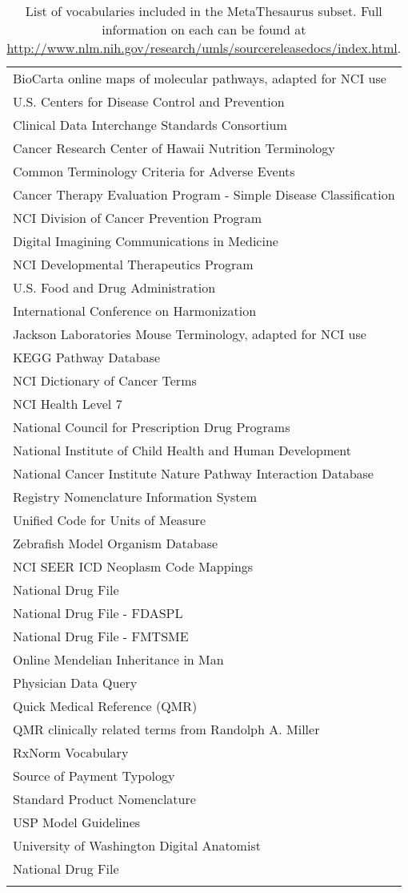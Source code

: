 \documentclass[Report.tex]{subfiles}
\begin{document}
\begin{longtable}{| p{} |}
BioCarta online maps of molecular pathways, adapted for NCI use\\
U.S. Centers for Disease Control and Prevention\\
Clinical Data Interchange Standards Consortium\\
Cancer Research Center of Hawaii Nutrition Terminology\\
Common Terminology Criteria for Adverse Events\\
Cancer Therapy Evaluation Program - Simple Disease Classification\\
NCI Division of Cancer Prevention Program\\
Digital Imagining Communications in Medicine\\
NCI Developmental Therapeutics Program\\
U.S. Food and Drug Administration\\
International Conference on Harmonization\\
Jackson Laboratories Mouse Terminology, adapted for NCI use\\
KEGG Pathway Database\\
NCI Dictionary of Cancer Terms\\
NCI Health Level 7\\
National Council for Prescription Drug Programs\\
National Institute of Child Health and Human Development\\
National Cancer Institute Nature Pathway Interaction Database\\
Registry Nomenclature Information System\\
Unified Code for Units of Measure\\
Zebrafish Model Organism Database\\
NCI SEER ICD Neoplasm Code Mappings\\
National Drug File\\
National Drug File - FDASPL\\
National Drug File - FMTSME\\
Online Mendelian Inheritance in Man\\
Physician Data Query\\
Quick Medical Reference (QMR)\\
QMR clinically related terms from Randolph A. Miller\\
RxNorm Vocabulary\\
Source of Payment Typology\\
Standard Product Nomenclature\\
USP Model Guidelines\\
University of Washington Digital Anatomist\\
National Drug File\\ \hline
\caption{List of vocabularies included in the MetaThesaurus subset. Full information on each can be found at \url{http://www.nlm.nih.gov/research/umls/sourcereleasedocs/index.html}.}
\label{tab:vocabs}
\end{longtable}
\end{document}
